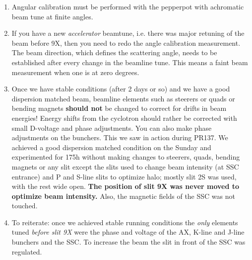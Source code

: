 \documentclass[11pt]{report}
\begin{document}
\begin{enumerate}
\item Angular calibration must be performed with the pepperpot with achromatic beam tune at finite angles.

\item If you have a new {\it accelerator} beamtune, i.e. there was major retuning of the beam before 9X, then
you need to redo the angle calibration measurement.
The beam direction, which defines the scattering angle, 
needs to be established after every change in the beamline tune.
This means a faint beam measurement when one is at zero degrees.

\item Once we have stable conditions (after 2 days or so) and we have
a good dispersion matched beam, beamline elements such as steerers or quads
or bending magnets {\bf should not} be changed to correct for drifts in beam energies!
Energy shifts from the cyclotron should rather be corrected with small D-voltage and phase adjustments.
You can also make phase adjustments on the bunchers.
This we saw in action during PR137.
We achieved a good dispersion matched condition on the Sunday and experimented for 175h without making changes 
to steerers, quads, bending magnets or any slit except the slits used to change beam intensity (at SSC entrance)
and P and S-line slits to optimize halo; mostly slit 2S was used, with the rest wide open.
{\bf The position of slit 9X was never moved to optimize beam intensity.}
Also, the magnetic fields of the SSC was not touched.




\item To reiterate: once we achieved stable running conditions the {\it only} elements tuned 
{\it before slit 9X} were the phase and voltage of the AX, K-line and J-line bunchers and the SSC. 
To increase the beam the slit in front of the SSC was regulated.


\end{enumerate}
\end{document}
